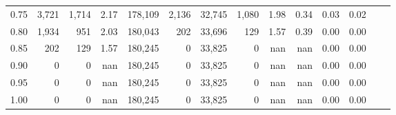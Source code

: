 \begin{tabular}{rrrrrrrrrrrrrr}
0.75 &   3,721 &  1,714 &    2.17 &  178,109 &    2,136 &  32,745 &   1,080 &  1.98 &  0.34 &  0.03 &      0.02 \\
0.80 &   1,934 &    951 &    2.03 &  180,043 &      202 &  33,696 &     129 &  1.57 &  0.39 &  0.00 &      0.00 \\
0.85 &     202 &    129 &    1.57 &  180,245 &        0 &  33,825 &       0 &   nan &   nan &  0.00 &      0.00 \\
0.90 &       0 &      0 &     nan &  180,245 &        0 &  33,825 &       0 &   nan &   nan &  0.00 &      0.00 \\
0.95 &       0 &      0 &     nan &  180,245 &        0 &  33,825 &       0 &   nan &   nan &  0.00 &      0.00 \\
1.00 &       0 &      0 &     nan &  180,245 &        0 &  33,825 &       0 &   nan &   nan &  0.00 &      0.00 \\
\bottomrule
\end{tabular}
